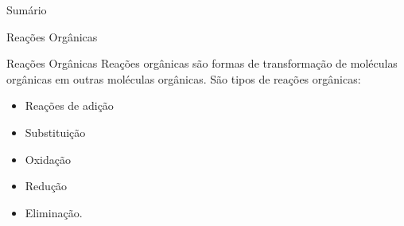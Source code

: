 \documentclass{beamer}
\author{fabio}
\date{\today}
\title{}
\begin{document}
\begin{frame}{Sumário}
\tableofcontents
\end{frame}

\begin{frame}[label={sec:org2a1306f}]{Reações Orgânicas}
\begin{block}{Reações Orgânicas}
Reações orgânicas são formas de transformação de moléculas orgânicas em outras moléculas orgânicas. São tipos de reações orgânicas:
\begin{itemize}
\item Reações de adição
\item Substituição
\item Oxidação
\item Redução
\item Eliminação.
\end{itemize}
\end{block}
\end{frame}
\end{document}

